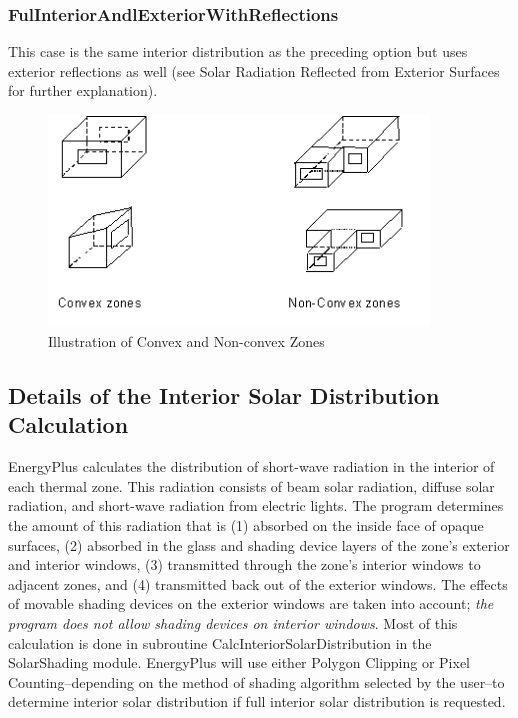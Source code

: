 \subsubsection{FulInteriorAndlExteriorWithReflections}\label{fulinteriorandlexteriorwithreflections}

This case is the same interior distribution as the preceding option but uses exterior reflections as well (see Solar Radiation Reflected from Exterior Surfaces for further explanation).

\begin{figure}[hbtp] %
\centering
\includegraphics[width=0.9\textwidth, height=0.9\textheight, keepaspectratio=true]{media/image646.png}
\caption{Illustration of Convex and Non-convex Zones \protect \label{fig:illustration-of-convex-and-non-convex-zones}}
\end{figure}

\subsection{Details of the Interior Solar Distribution Calculation}\label{details-of-the-interior-solar-distribution-calculation}

EnergyPlus calculates the distribution of short-wave radiation in the interior of each thermal zone. This radiation consists of beam solar radiation, diffuse solar radiation, and short-wave radiation from electric lights. The program determines the amount of this radiation that is (1) absorbed on the inside face of opaque surfaces, (2) absorbed in the glass and shading device layers of the zone's exterior and interior windows, (3) transmitted through the zone's interior windows to adjacent zones, and (4) transmitted back out of the exterior windows. The effects of movable shading devices on the exterior windows are taken into account; \emph{the program does not allow shading devices on interior windows}. Most of this calculation is done in subroutine CalcInteriorSolarDistribution in the SolarShading module. EnergyPlus will use either Polygon Clipping or Pixel Counting--depending on the method of shading algorithm selected by the user--to determine interior solar distribution if full interior solar distribution is requested.

